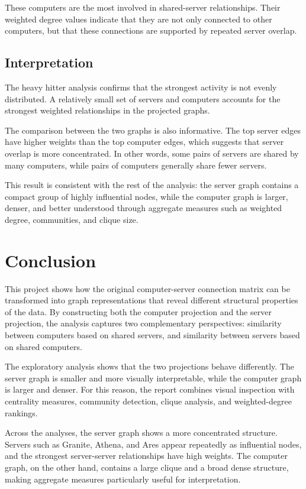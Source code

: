 \documentclass[11pt,a4paper]{article}
\begin{document}
These computers are the most involved in shared-server relationships. Their weighted degree values indicate that they are not only connected to other computers, but that these connections are supported by repeated server overlap.

\subsection{Interpretation}

The heavy hitter analysis confirms that the strongest activity is not evenly distributed. A relatively small set of servers and computers accounts for the strongest weighted relationships in the projected graphs.

The comparison between the two graphs is also informative. The top server edges have higher weights than the top computer edges, which suggests that server overlap is more concentrated. In other words, some pairs of servers are shared by many computers, while pairs of computers generally share fewer servers.

This result is consistent with the rest of the analysis: the server graph contains a compact group of highly influential nodes, while the computer graph is larger, denser, and better understood through aggregate measures such as weighted degree, communities, and clique size.

\section{Conclusion}

This project shows how the original computer-server connection matrix can be transformed into graph representations that reveal different structural properties of the data. By constructing both the computer projection and the server projection, the analysis captures two complementary perspectives: similarity between computers based on shared servers, and similarity between servers based on shared computers.

The exploratory analysis shows that the two projections behave differently. The server graph is smaller and more visually interpretable, while the computer graph is larger and denser. For this reason, the report combines visual inspection with centrality measures, community detection, clique analysis, and weighted-degree rankings.

Across the analyses, the server graph shows a more concentrated structure. Servers such as Granite, Athena, and Ares appear repeatedly as influential nodes, and the strongest server-server relationships have high weights. The computer graph, on the other hand, contains a large clique and a broad dense structure, making aggregate measures particularly useful for interpretation.
\end{document}
